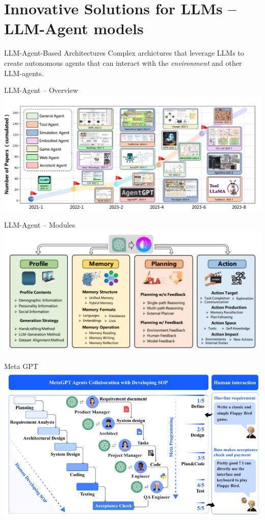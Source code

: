 \documentclass[presentation, 10pt]{beamer}\mode<presentation>{\usetheme{AMSBolognaFC}}
\begin{document}
\section{Innovative Solutions for LLMs -- LLM-Agent models}
\begin{frame}[plain]
\centering
\huge{LLM-Agent-Based Architectures}
\large{ 
Complex archictures that leverage LLMs to create autonomous agents that can interact with the \emph{environment} and other LLM-agents.
}
\end{frame}
\begin{frame}{LLM-Agent -- Overview~\cite{wang2023survey}}
	\includegraphics[width=\textwidth]{img/number-of-papers.png}
\end{frame}
\begin{frame}{LLM-Agent -- Modules}
	\includegraphics[width=\textwidth]{img/overview-agents.png}
\end{frame}
\begin{frame}{Meta GPT~\cite{hong2023metagpt}}
\includegraphics[width=\textwidth]{img/meta-gpt-idea.png}
\end{frame}
\end{document}
